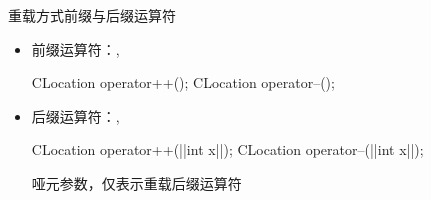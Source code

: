 \begin{frame}[t, fragile]{重载方式}{前缀与后缀运算符}%
  \begin{spacing}{2.0}
  \begin{itemize}
  \item 前缀运算符：, \\
    \begin{center}
      \begin{minipage}{0.5\linewidth}
        \begin{cpptt}
CLocation operator++();
CLocation operator--();
        \end{cpptt}
      \end{minipage}
    \end{center}
  \item 后缀运算符：, \\
    \begin{center}
      \begin{minipage}{0.4\linewidth}
        \begin{cpptt}
CLocation operator++(||int x||);
CLocation operator--(||int x||);
        \end{cpptt}
      \end{minipage}\qquad
      \begin{boxedminipage}{0.4\linewidth}
        \tiny
        \alert{哑元参数}，仅表示重载后缀运算符
      \end{boxedminipage}
    \end{center}
  \end{itemize}
  \end{spacing}
\end{frame}

